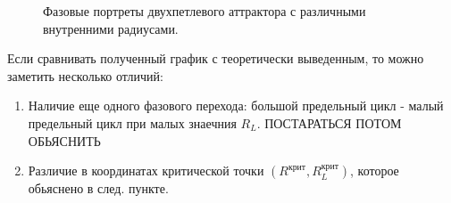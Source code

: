 \documentclass[12pt]{article}
\begin{document}
\begin{figure}[H]
	\centering
	\begin{minipage}[h]{0.47\linewidth}
	\end{minipage}
	\hfill
	\begin{minipage}[h]{0.47\linewidth}
	\end{minipage}
	\caption{Фазовые портреты двухпетлевого аттрактора с различными внутренними радиусами.}
	\label{fig:real_fig_3}
\end{figure}

Если сравнивать полученный график с теоретически выведенным, то можно заметить несколько отличий:
\begin{enumerate}
	\item Наличие еще одного фазового перехода: большой предельный цикл - малый предельный цикл при малых знаечния $R_L$. ПОСТАРАТЬСЯ ПОТОМ ОБЬЯСНИТЬ
	\item Различие в координатах критической точки $(R^{\text{крит}}, R_L^{\text{крит}})$, которое обьяснено в след. пункте.
\end{enumerate}
\end{document}
